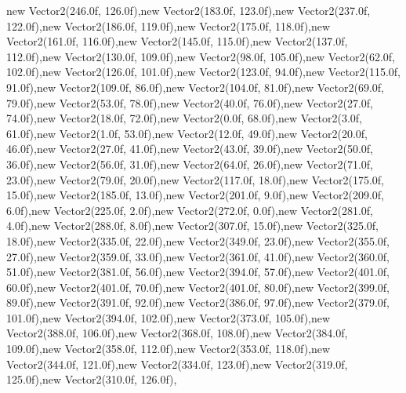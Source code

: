 new Vector2(246.0f, 126.0f),new Vector2(183.0f, 123.0f),new Vector2(237.0f, 122.0f),new Vector2(186.0f, 119.0f),new Vector2(175.0f, 118.0f),new Vector2(161.0f, 116.0f),new Vector2(145.0f, 115.0f),new Vector2(137.0f, 112.0f),new Vector2(130.0f, 109.0f),new Vector2(98.0f, 105.0f),new Vector2(62.0f, 102.0f),new Vector2(126.0f, 101.0f),new Vector2(123.0f, 94.0f),new Vector2(115.0f, 91.0f),new Vector2(109.0f, 86.0f),new Vector2(104.0f, 81.0f),new Vector2(69.0f, 79.0f),new Vector2(53.0f, 78.0f),new Vector2(40.0f, 76.0f),new Vector2(27.0f, 74.0f),new Vector2(18.0f, 72.0f),new Vector2(0.0f, 68.0f),new Vector2(3.0f, 61.0f),new Vector2(1.0f, 53.0f),new Vector2(12.0f, 49.0f),new Vector2(20.0f, 46.0f),new Vector2(27.0f, 41.0f),new Vector2(43.0f, 39.0f),new Vector2(50.0f, 36.0f),new Vector2(56.0f, 31.0f),new Vector2(64.0f, 26.0f),new Vector2(71.0f, 23.0f),new Vector2(79.0f, 20.0f),new Vector2(117.0f, 18.0f),new Vector2(175.0f, 15.0f),new Vector2(185.0f, 13.0f),new Vector2(201.0f, 9.0f),new Vector2(209.0f, 6.0f),new Vector2(225.0f, 2.0f),new Vector2(272.0f, 0.0f),new Vector2(281.0f, 4.0f),new Vector2(288.0f, 8.0f),new Vector2(307.0f, 15.0f),new Vector2(325.0f, 18.0f),new Vector2(335.0f, 22.0f),new Vector2(349.0f, 23.0f),new Vector2(355.0f, 27.0f),new Vector2(359.0f, 33.0f),new Vector2(361.0f, 41.0f),new Vector2(360.0f, 51.0f),new Vector2(381.0f, 56.0f),new Vector2(394.0f, 57.0f),new Vector2(401.0f, 60.0f),new Vector2(401.0f, 70.0f),new Vector2(401.0f, 80.0f),new Vector2(399.0f, 89.0f),new Vector2(391.0f, 92.0f),new Vector2(386.0f, 97.0f),new Vector2(379.0f, 101.0f),new Vector2(394.0f, 102.0f),new Vector2(373.0f, 105.0f),new Vector2(388.0f, 106.0f),new Vector2(368.0f, 108.0f),new Vector2(384.0f, 109.0f),new Vector2(358.0f, 112.0f),new Vector2(353.0f, 118.0f),new Vector2(344.0f, 121.0f),new Vector2(334.0f, 123.0f),new Vector2(319.0f, 125.0f),new Vector2(310.0f, 126.0f),